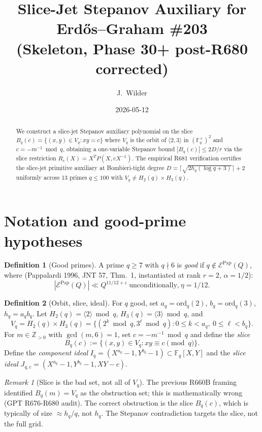 \documentclass[12pt]{amsart}
\title{Slice-Jet Stepanov Auxiliary for Erd\H{o}s--Graham \#203\\
{\small (Skeleton, Phase 30+ post-R680 corrected)}}
\author{J.\ Wilder}
\date{2026-05-12}
\theoremstyle{definition}
\newtheorem{definition}{Definition}
\theoremstyle{remark}
\newtheorem{remark}{Remark}
\begin{document}
\maketitle

\begin{abstract}
We construct a slice-jet Stepanov auxiliary polynomial on the slice
$B_q(c) = \{(x, y) \in V_q : xy = c\}$ where $V_q$ is the orbit of
$\langle 2, 3 \rangle$ in $(\mathbb{F}_q^\times)^2$ and $c = -m^{-1} \bmod q$,
obtaining a one-variable Stepanov bound $|B_q(c)| \leq 2D/r$ via the
slice restriction $R_c(X) = X^T P(X, c X^{-1})$. The empirical R681 verification
certifies the slice-jet primitive auxiliary at Bombieri-tight degree
$D = \lceil \sqrt{2 h_q (\log q + 3)} \rceil + 2$ uniformly across 13 primes
$q \le 100$ with $V_q \neq H_2(q) \times H_3(q)$.
\end{abstract}

\section{Notation and good-prime hypotheses}

\begin{definition}[Good primes]
A prime $q \ge 7$ with $q \nmid 6$ is \emph{good} if $q \notin \mathcal{E}^{\mathrm{Pap}}(Q)$, where (Pappalardi 1996, JNT 57, Thm.\ 1, instantiated at rank $r=2$, $\alpha=1/2$):
$$
|\mathcal{E}^{\mathrm{Pap}}(Q)| \ll Q^{11/12+\varepsilon}\ \text{unconditionally,}\ \eta = 1/12.
$$
\end{definition}

\begin{definition}[Orbit, slice, ideal]
For $q$ good, set $a_q = \mathrm{ord}_q(2)$, $b_q = \mathrm{ord}_q(3)$, $h_q = a_q b_q$.
Let $H_2(q) = \langle 2 \rangle \bmod q$, $H_3(q) = \langle 3 \rangle \bmod q$, and
$$
V_q = H_2(q) \times H_3(q) = \{(2^k \bmod q, 3^\ell \bmod q) : 0 \le k < a_q,\ 0 \le \ell < b_q\}.
$$
For $m \in \mathbb{Z}_{>0}$ with $\gcd(m, 6) = 1$, set $c = -m^{-1} \bmod q$ and define the
\emph{slice}
$$
B_q(c) := \{(x, y) \in V_q : xy \equiv c \pmod q\}.
$$
Define the \emph{component ideal} $I_q = (X^{a_q} - 1, Y^{b_q} - 1) \subset \mathbb{F}_q[X, Y]$
and the \emph{slice ideal} $J_{q,c} = (X^{a_q} - 1, Y^{b_q} - 1, XY - c)$.
\end{definition}

\begin{remark}[Slice is the bad set, not all of $V_q$]
The previous R660B framing identified $B_q(m) = V_q$ as the obstruction set;
this is mathematically wrong (GPT R676-R680 audit). The correct obstruction
is the slice $B_q(c)$, which is typically of size $\approx h_q / q$, not $h_q$.
The Stepanov contradiction targets the slice, not the full grid.
\end{remark}
\end{document}

